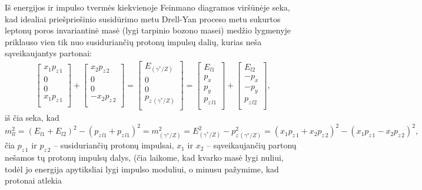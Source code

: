 \documentclass[a4paper, 12pt, oneside]{article}
\newlength\q
\begin{document}
Iš energijos ir impulso tvermės kiekvienoje Feinmano diagramos viršūnėje seka, kad idealiai priešpriešinio susidūrimo metu
Drell-Yan proceso metu sukurtos leptonų poros invariantinė masė (lygi tarpinio bozono masei) medžio lygmenyje priklauso vien
tik nuo susiduriančių protonų impulsų dalių, kurias neša sąveikaujantys partonai:
\begin{align}
\label{eq:DY4vec}
	\begin{bmatrix}
		x_1p_{z\,1} \\		
		0 \\
		0 \\
		x_1p_{z\,1} \\
	\end{bmatrix}
	+
	\begin{bmatrix}
		x_2p_{z\,2} \\
		0 \\
		0 \\
		-x_2p_{z\,2} \\
	\end{bmatrix}
	=
	\begin{bmatrix}
		E_{(\gamma^*\!/\!Z)} \\
		0 \\
		0 \\
		p_{z\,(\gamma^*\!/\!Z)} \\
	\end{bmatrix}
	=
	\begin{bmatrix}
		E_{l1} \\
		p_{x} \\
		p_{y} \\
		p_{z\,l1} \\
	\end{bmatrix}
	+
	\begin{bmatrix}
		E_{l2} \\
		-p_{x} \\
		-p_{y} \\
		p_{z\,l2} \\
	\end{bmatrix}	
	,
\end{align}
iš čia seka, kad
\begin{equation}
\label{eq:DYinvm}
	m^2_{ll} = (E_{l1}+E_{l2})^2-(p_{z\,l1}+p_{z\,l1})^2 = m^2_{(\gamma^*\!/\!Z)} = E^2_{(\gamma^*\!/\!Z)}-p^2_{z\,(\gamma^*\!/\!Z)} =
	(x_1p_{z\,1}+x_2p_{z\,2})^2-(x_1p_{z\,1}-x_2p_{z\,2})^2 ,
\end{equation}
čia $p_{z\,1}$ ir $p_{z\,2}$ -- susiduriančių protonų impulsai, $x_1$ ir $x_2$ -- sąveikaujančių partonų nešamos tų protonų impulsų dalys,
(čia laikome, kad kvarko masė lygi nuliui, todėl jo energija apytiksliai lygi impulso moduliui, o minusu pažymime, kad protonai atlekia
\end{document}

